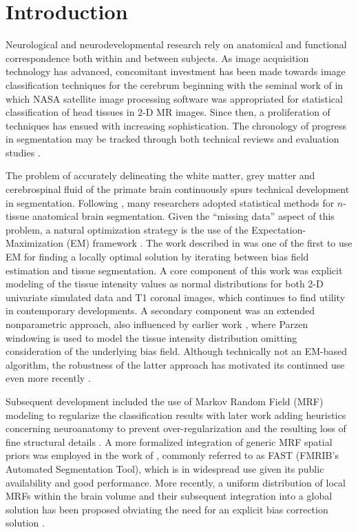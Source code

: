 \documentclass[11pt,english]{article}
\begin{document}
\clearpage

\section{Introduction} Neurological and neurodevelopmental research
rely on anatomical and functional correspondence both within and
between subjects.  As image acquisition technology has advanced,
concomitant investment has been made towards image classification
techniques for the cerebrum beginning with the seminal work of
\cite{Vannier1985} in which NASA satellite image processing software
was appropriated for statistical classification of head tissues in 2-D
MR images.  Since then, a proliferation of techniques has ensued with
increasing sophistication.  The chronology of progress in segmentation
may be tracked through both technical reviews
\citep{Bezdek1993,Pal1993,Clarke1995,Pham2000,Viergever2001,Suri2002,Duncan2004,Balafar2010}
and evaluation studies
\citep[e.g.][]{Cuadra2005,Zaidi2006,Klauschen2009,Boer2010}.

The problem of accurately delineating the white matter, grey matter
and cerebrospinal fluid of the primate brain continuously spurs
technical development in segmentation.  Following \cite{Vannier1985},
many researchers adopted statistical methods for $n$-tissue anatomical
brain segmentation.  Given the ``missing data'' aspect of this
problem, a natural optimization strategy is the use of the
Expectation-Maximization (EM) framework \citep{Dempster1977}.  The
work described in \cite{Wells1996} was one of the first to use EM for
finding a locally optimal solution by iterating between bias field
estimation and tissue segmentation.  A core component of this work was
explicit modeling of the tissue intensity values as normal
distributions \citep{Cline1990} for both 2-D univariate simulated data
and T1 coronal images, which continues to find utility in contemporary
developments.  A secondary component was an extended nonparametric
approach, also influenced by earlier work \citep{Kikinis1992}, where
Parzen windowing is used to model the tissue intensity distribution
omitting consideration of the underlying bias field.  Although
technically not an EM-based algorithm, the robustness of the latter
approach has motivated its continued use even more recently \citep[e.g.][]{Weisenfeld2009}.

Subsequent development included the use of Markov Random Field (MRF)  modeling \citep{Geman1984}
to regularize the classification results \citep{Held1997} with later work adding heuristics concerning neuroanatomy to prevent 
over-regularization and the resulting loss of fine structural details \citep{Leemput1999,Leemput1999a}.  
A more formalized integration of generic MRF spatial priors was employed in the work of \cite{Zhang2001}, 
commonly referred to as FAST (FMRIB's Automated Segmentation Tool), which is in widespread use
given its public availability and good performance.  More recently, a uniform distribution of local MRFs within the brain volume and their subsequent integration into a global solution has been proposed obviating the need for an 
explicit bias correction solution \citep{Scherrer2009}.  
\end{document}
